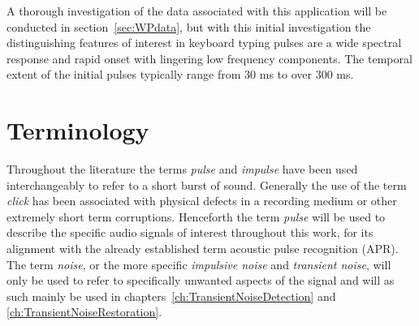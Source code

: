 A thorough investigation of the data associated with this application will be conducted in section~\ref{sec:WPdata}, but with this initial investigation the distinguishing features of interest in keyboard typing pulses are a wide spectral response and rapid onset with lingering low frequency components. The temporal extent of the initial pulses typically range from 30 ms to over 300 ms.
%


\section{Terminology}
Throughout the literature the terms \emph{pulse}\cite{Esquef2002a}\cite{Esquef2003a} and \emph{impulse}\cite{Czyzewski1995}\cite{Kauppinen2002a}\cite{Chen2000} have been used interchangeably to refer to a short burst of sound. Generally the use of the term \emph{click}\cite{Czyzewski1995}\cite{Esquef2002}\cite{Godsill1998book} has been associated with physical defects in a recording medium or other extremely short term corruptions. Henceforth the term \emph{pulse} will be used to describe the specific audio signals of interest throughout this work, for its alignment with the already established term acoustic pulse recognition (APR)\cite{TouchSystems2006}. The term \emph{noise}, or the more specific \emph{impulsive noise} and \emph{transient noise}, will only be used to refer to specifically unwanted aspects of the signal and will as such mainly be used in chapters~\ref{ch:TransientNoiseDetection} and \ref{ch:TransientNoiseRestoration}.

